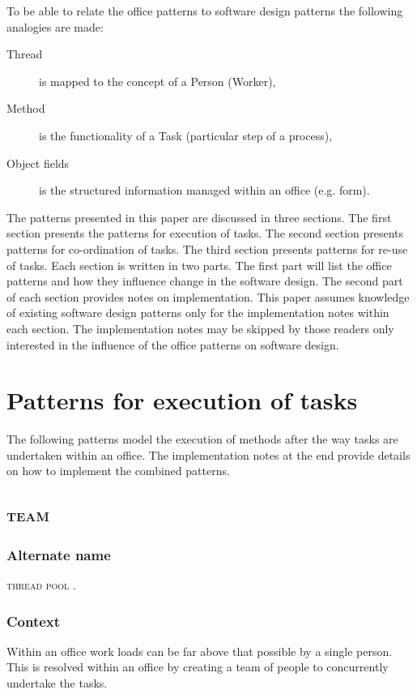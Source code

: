 \documentclass[prodmode]{style/acmlarge}
\begin{document}
To be able to relate the office patterns to software design patterns the
following analogies are made:
\begin{description}
  \item[Thread] is mapped to the concept of a Person (Worker),
  \item[Method] is the functionality of a Task (particular step of a process),
  \item[Object fields] is the structured information managed within an office (e.g. form).
\end{description}

The patterns presented in this paper are discussed in three sections.  The first
section presents the patterns for execution of tasks.  The second section
presents patterns for co-ordination of tasks.  The third section presents
patterns for re-use of tasks.  Each section is written in two parts.  The first
part will list the office patterns and how they influence change in the software
design.  The second part of each section provides notes on implementation.  This
paper assumes knowledge of existing software design patterns only for the
implementation notes within each section.  The implementation notes may be
skipped by those readers only interested in the influence of the office patterns
on software design.



\section{Patterns for execution of tasks}

The following patterns model the execution of methods after the way tasks are
undertaken within an office.  The implementation notes at the end provide
details on how to implement the combined patterns.


\subsection{\textsc{\textbf{team}}}

\subsubsection*{Alternate name} \textsc{thread pool} \cite{thread-per-request}.

\subsubsection*{Context} Within an office work loads can be far above that
possible by a single person. This is resolved within an office by creating a
team of people to concurrently undertake the tasks.
\end{document}
